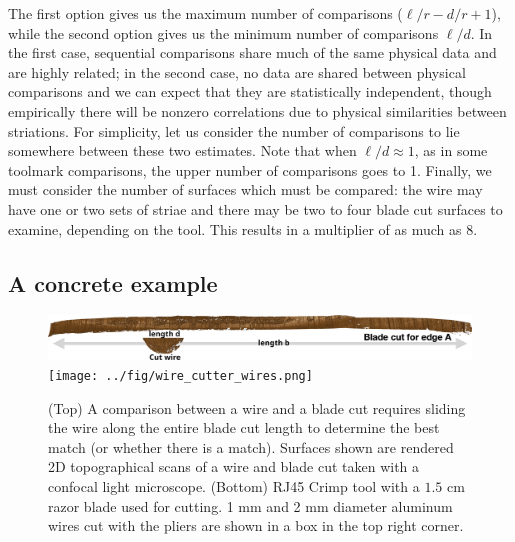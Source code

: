 \documentclass[9pt,twocolumn,twoside]{pnas-new}\usepackage[]{graphicx}\usepackage[dvipsnames]{xcolor}
\providecommand{\DIFadd}[1]{{\protect\color{blue}\uwave{#1}}} %
\providecommand{\DIFdel}[1]{{\protect\color{red}\sout{#1}}}                      %
\providecommand{\DIFaddbegin}{} %
\providecommand{\DIFaddend}{} %
\providecommand{\DIFdelbegin}{} %
\providecommand{\DIFdelend}{} %
\newcommand{\DIFscaledelfig}{0.5}
\newlength{\DIFdelgraphicswidth} %
\newlength{\DIFdelgraphicsheight} %
\newcommand{\DIFaddincludegraphics}[2][]{{\color{blue}\fbox{\DIFOincludegraphics[#1]{#2}}}} %
\newcommand{\DIFdelincludegraphics}[2][]{%
\sbox{\DIFdelgraphicsbox}{\DIFOincludegraphics[#1]{#2}}%
\settoboxwidth{\DIFdelgraphicswidth}{\DIFdelgraphicsbox} %
\settoboxtotalheight{\DIFdelgraphicsheight}{\DIFdelgraphicsbox} %
\scalebox{\DIFscaledelfig}{%
\parbox[b]{\DIFdelgraphicswidth}{\usebox{\DIFdelgraphicsbox}\\[-\baselineskip] \rule{\DIFdelgraphicswidth}{0em}}\llap{\resizebox{\DIFdelgraphicswidth}{\DIFdelgraphicsheight}{%
\setlength{\unitlength}{\DIFdelgraphicswidth}%
\begin{picture}(1,1)%
\thicklines\linethickness{2pt} %
{\color[rgb]{1,0,0}\put(0,0){\framebox(1,1){}}}%
{\color[rgb]{1,0,0}\put(0,0){\line( 1,1){1}}}%
{\color[rgb]{1,0,0}\put(0,1){\line(1,-1){1}}}%
\end{picture}%
}\hspace*{3pt}}} %
} %
\DeclareRobustCommand{\DIFaddbegin}{\DIFOaddbegin \let\includegraphics\DIFaddincludegraphics} %
\DeclareRobustCommand{\DIFaddend}{\DIFOaddend \let\includegraphics\DIFOincludegraphics} %
\DeclareRobustCommand{\DIFdelbegin}{\DIFOdelbegin \let\includegraphics\DIFdelincludegraphics} %
\DeclareRobustCommand{\DIFdelend}{\DIFOaddend \let\includegraphics\DIFOincludegraphics} %
\begin{document}
The first option gives us the maximum number of comparisons (\DIFdelbegin \DIFdel{$\ell/r - d/r + 1$}\DIFdelend \DIFaddbegin \DIFadd{$b/r - d/r + 1$}\DIFaddend ), while the second option gives us the minimum number of comparisons \DIFdelbegin \DIFdel{$\ell/d$}\DIFdelend \DIFaddbegin \DIFadd{$b/d$}\DIFaddend .
In the first case, sequential comparisons share much of the same physical data and are highly related; in the second case, no data are shared between physical comparisons and we can expect that they are statistically independent, though empirically there will be nonzero correlations due to physical similarities between striations.
For simplicity, let us consider the number of comparisons to lie somewhere between these two estimates.
Note that when \DIFdelbegin \DIFdel{$\ell/d \approx 1$}\DIFdelend \DIFaddbegin \DIFadd{$b/d \approx 1$}\DIFaddend , as in some toolmark comparisons, the upper number of comparisons goes to 1.
Finally, we must consider the number of surfaces which must be compared: the wire may have one or two sets of striae and there may be  two to four blade cut surfaces to examine, depending on the tool.
This results in a multiplier of as much as 8.

\subsection*{A concrete example}



\begin{figure}[t!]
\centering
\includegraphics[width=\columnwidth]{../fig/wire-blade-comparison-label.png}
\texttt{[image: ../fig/wire\_cutter\_wires.png]}
\caption{(Top) A comparison between a wire and a blade cut requires sliding the wire along the entire blade cut length to determine the best match (or whether there is a match). Surfaces shown are rendered 2D topographical scans of a wire and blade cut taken with a confocal light microscope. (Bottom) RJ45 Crimp tool with a $1.5$ cm razor blade used for cutting. 1 mm and 2 mm diameter aluminum wires cut with the pliers are shown in a box in the top right corner.}\label{fig:tool-pic}\label{fig:wire-blade}
\end{figure}
\end{document}
